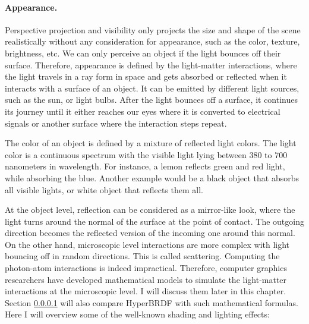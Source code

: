 
\paragraph{Appearance.}
Perspective projection and visibility only projects the size and shape of the scene realistically without any consideration for appearance, such as the color, texture, brightness, etc. We can only perceive an object if the light bounces off their surface. Therefore, appearance is defined by the light-matter interactions, where the light travels in a ray form in space and gets absorbed or reflected when it interacts with a surface of an object. It can be emitted by different light sources, such as the sun, or light bulbs. After the light bounces off a surface, it continues its journey until it either reaches our eyes where it is converted to electrical signals or another surface where the interaction steps repeat.

The color of an object is defined by a mixture of reflected light colors. The light color is a continuous spectrum with the visible light lying between 380 to 700 nanometers in wavelength. For instance, a lemon reflects green and red light, while absorbing the blue. Another example would be a black object that absorbs all visible lights, or white object that reflects them all.

At the object level, reflection can be considered as a mirror-like look, where the light turns around the normal of the surface at the point of contact. The outgoing direction becomes the reflected version of the incoming one around this normal. On the other hand, microscopic level interactions are more complex with light bouncing off in random directions. This is called scattering. Computing the photon-atom interactions is indeed impractical. Therefore, computer graphics researchers have developed mathematical models to simulate the light-matter interactions at the microscopic level. I will discuss them later in this chapter. Section \ref{} will also compare HyperBRDF with such mathematical formulas. Here I will overview some of the well-known shading and lighting effects:


